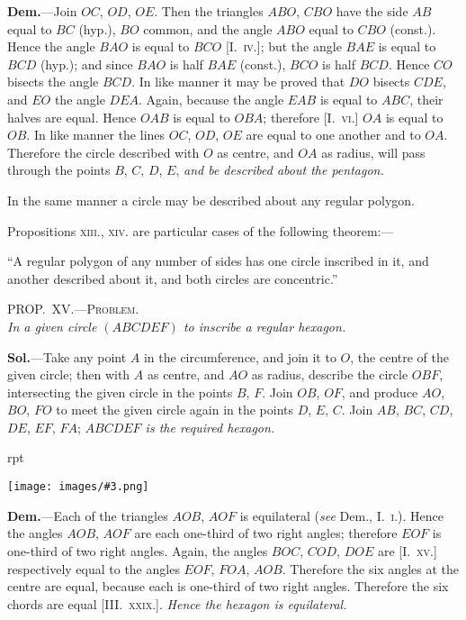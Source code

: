 \documentclass[oneside]{book}
\newcounter{wrapwidth}
\newcommand\myprop[2]{
\bigskip\Needspace*{4\baselineskip}\begin{center}\textsc{#1}\\\medskip\emph{#2}\par\end{center}
}
\newcommand\imgflow[3]{
\setcounter{wrapwidth}{#1}
\begin{wrapfigure}[#2]{r}{\value{wrapwidth}pt}
\begin{center}
\vspace{-0.3in}
\texttt{[image: images/\#3.png]}
\end{center}
\end{wrapfigure}
}
\begin{document}
\textbf{Dem.}---Join $OC$, $OD$, $OE$. Then the triangles\label{traingles} $ABO$,
$CBO$ have the side $AB$ equal to
$BC$ (hyp.), $BO$ common, and the
angle $ABO$ equal to $CBO$ (const.).
Hence the angle $BAO$ is equal to
$BCO$ [\textsc{I.~iv.}]; but the angle $BAE$
is equal to $BCD$ (hyp.); and since
$BAO$ is half $BAE$ (const.), $BCO$
is half $BCD$. Hence $CO$ bisects
the angle $BCD$. In like manner
it may be proved that $DO$ bisects
$CDE$, and $EO$ the angle $DEA$. Again, because the
angle $EAB$ is equal to $ABC$, their halves are equal.
Hence $OAB$ is equal to $OBA$; therefore [\textsc{I.~vi.}] $OA$ is
equal to $OB$. In like manner the lines $OC$, $OD$, $OE$
are equal to one another and to $OA$. Therefore the
circle described with $O$ as centre, and $OA$ as radius,
will pass through the points $B$, $C$, $D$, $E$, \emph{and be described
about the pentagon.}

In the same manner a circle may be described about
any regular polygon.\par\smallskip


\begin{footnotesize}
Propositions \textsc{xiii.}, \textsc{xiv.} are particular cases of the following
theorem:---

``A regular polygon of any number of sides has one circle inscribed
in it, and another described about it, and both circles are
concentric.''
\end{footnotesize}

\myprop{PROP\@.~XV\@.---Problem.}{In a given circle $(ABCDEF)$ to inscribe a regular hexagon.}

\textbf{Sol.}---Take any point $A$ in the circumference, and
join it to $O$, the centre
of the given circle; then
with $A$ as centre, and $AO$
as radius, describe the
circle $OBF$, intersecting
the given circle in the
points $B$, $F$. Join $OB$,
$OF$, and produce $AO$, $BO$,
$FO$ to meet the given
circle again in the points $D$, $E$, $C$. Join $AB$, $BC$, $CD$,
$DE$, $EF$, $FA$; \emph{$ABCDEF$ is the required hexagon.}

\imgflow{156}{8}{f167}

\textbf{Dem.}---Each of the triangles $AOB$, $AOF$ is equilateral
(\emph{see} Dem., \textsc{I.~i.}). Hence the angles $AOB$, $AOF$
are each one-third of two right angles; therefore $EOF$
is one-third of two right angles. Again, the angles
$BOC$, $COD$, $DOE$ are [\textsc{I.~xv.}] respectively equal to the
angles $EOF$, $FOA$, $AOB$. Therefore the six angles at
the centre are equal, because each is one-third of two
right angles. Therefore the six chords are equal [\textsc{III\@.~xxix.}].
\emph{Hence the hexagon is equilateral.}
\end{document}
